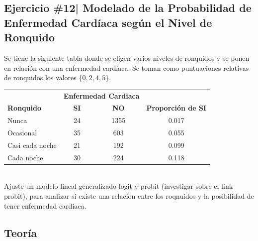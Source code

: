 \newpage

\begin{myblock}
\section*{Ejercicio \#12| Modelado de la Probabilidad de Enfermedad Cardíaca según el Nivel de Ronquido}

Se tiene la siguiente tabla donde se eligen varios niveles de ronquidos y se ponen en relación con 
una enfermedad cardíaca. Se toman como puntuaciones relativas de ronquidos los valores $\{0, 2, 4, 5\}$.
\\

\begin{tabular}{lccc}
\hline
                & \multicolumn{2}{c}{\textbf{Enfermedad Cardiaca}} &                     \\ \cline{2-3}
\textbf{Ronquido}        & \textbf{SI}            & \textbf{NO}             & \textbf{Proporción de SI} \\ \hline
Nunca           & 24           & 1355          & 0.017               \\
Ocasional       & 35           & 603           & 0.055               \\
Casi cada noche & 21           & 192           & 0.099               \\
Cada noche      & 30           & 224           & 0.118               \\ \hline
\end{tabular}\\

Ajuste un modelo lineal generalizado logit y probit (investigar sobre el link probit), para analizar 
si existe una relación entre los roqnuidos y la posibilidad de tener enfermedad cardiaca. 

\end{myblock}


\subsection{Teoría}

